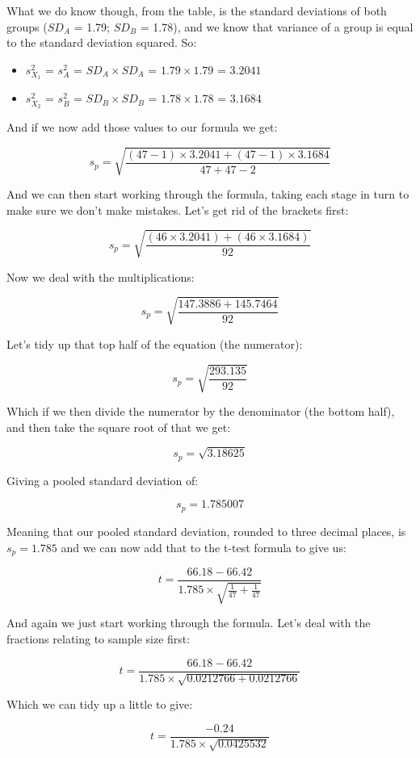 \documentclass[
  oneside]{book}
\providecommand{\tightlist}{%
  \setlength{\itemsep}{0pt}\setlength{\parskip}{0pt}}
\begin{document}
What we do know though, from the table, is the standard deviations of both groups (\(SD_A\) = 1.79; \(SD_B\) = 1.78), and we know that variance of a group is equal to the standard deviation squared. So:

\begin{itemize}
\tightlist
\item
  \(s^2_{X_1}\) = \(s^2_A\) = \(SD_A \times SD_A\) = \(1.79 \times 1.79\) = \(3.2041\)
\item
  \(s^2_{X_2}\) = \(s^2_B\) = \(SD_B \times SD_B\) = \(1.78 \times 1.78\) = \(3.1684\)
\end{itemize}

And if we now add those values to our formula we get:

\[s_p = \sqrt{\frac{(47 -1)  \times 3.2041 + (47 -1)\times 3.1684}{47 + 47 - 2}}\]

And we can then start working through the formula, taking each stage in turn to make sure we don't make mistakes. Let's get rid of the brackets first:

\[s_p = \sqrt{\frac{(46  \times 3.2041) + (46 \times 3.1684)}{92}}\]

Now we deal with the multiplications:

\[s_p = \sqrt{\frac{147.3886 + 145.7464}{92}}\]

Let's tidy up that top half of the equation (the numerator):

\[s_p = \sqrt{\frac{293.135}{92}}\]

Which if we then divide the numerator by the denominator (the bottom half), and then take the square root of that we get:

\[s_p = \sqrt{3.18625}\]

Giving a pooled standard deviation of:

\[s_p = 1.785007\]

Meaning that our pooled standard deviation, rounded to three decimal places, is \(s_p = 1.785\) and we can now add that to the t-test formula to give us:

\[t = \frac{66.18 - 66.42}{1.785 \times \sqrt{\frac{1}{47} + \frac{1}{47}}}\]

And again we just start working through the formula. Let's deal with the fractions relating to sample size first:

\[t = \frac{66.18 - 66.42}{1.785 \times \sqrt{0.0212766 + 0.0212766}}\]

Which we can tidy up a little to give:

\[t = \frac{-0.24}{1.785 \times \sqrt{0.0425532}}\]
\end{document}
